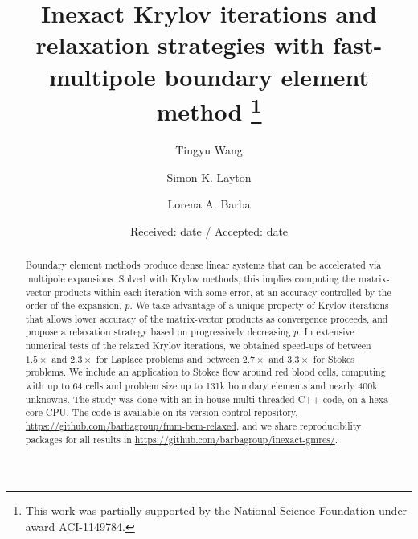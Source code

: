 \documentclass[smallcondensed,final]{svjour3}
\begin{document}
\title{Inexact Krylov iterations and relaxation strategies with fast-multipole boundary element method \thanks{
	This work was partially supported by the National Science Foundation under award ACI-1149784.}
}

\author{%
Tingyu Wang \and Simon K. Layton \and  Lorena A. Barba
}


\date{Received: date / Accepted: date}

\maketitle

\begin{abstract}
Boundary element methods produce dense linear systems that can be accelerated via multipole expansions. Solved with Krylov methods, this implies computing the matrix-vector products within each iteration with some error, at an accuracy controlled by the order of the expansion, $p$. We take advantage of a unique property of Krylov iterations that allows lower accuracy of the matrix-vector products as convergence proceeds, and propose a relaxation strategy based on progressively decreasing $p$. In extensive numerical tests of the relaxed Krylov iterations, we obtained speed-ups of between $1.5\times$ and $2.3\times$ for Laplace problems and between $2.7\times$ and $3.3\times$ for Stokes problems. We include an application to Stokes flow around red blood cells, computing with up to 64 cells and problem size up to 131k boundary elements and nearly 400k unknowns. The study was done with an in-house multi-threaded C++ code, on a hexa-core CPU. The code is available on its version-control repository, \url{https://github.com/barbagroup/fmm-bem-relaxed}, and we share reproducibility packages for all results in \url{https://github.com/barbagroup/inexact-gmres/}.

\end{abstract}
\end{document}
